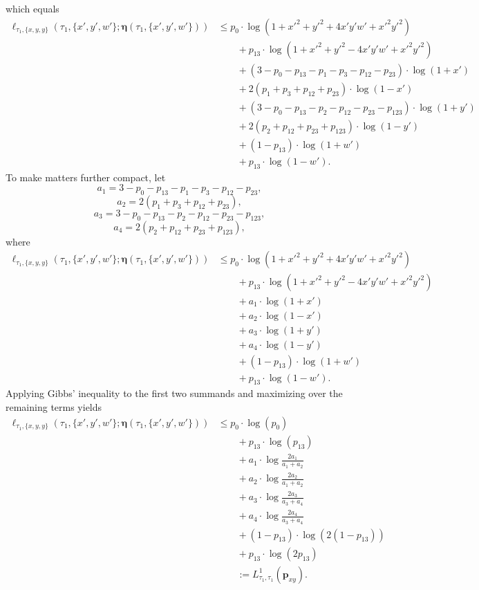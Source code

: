 \documentclass[a4paper]{article}
\newcommand{\fullAncestralSplitPartitions}{\boldsymbol\eta}
\begin{document}
which equals
\begin{align*}
    \ell_{\tau_1,\{x,y,y\}}(\tau_1, \{x',y',w'\}; \fullAncestralSplitPartitions(\tau_1,\{x',y',w'\}))
    &\le      p_{0}  \cdot\log(1+x'^2+y'^2+4x'y'w'+x'^2y'^2) \\
    &\qquad + p_{13} \cdot\log(1+x'^2+y'^2-4x'y'w'+x'^2y'^2) \\
    &\qquad + (3-p_{0}-p_{13}-p_{1}-p_{3}-p_{12}-p_{23})\cdot\log(1+x') \\
    &\qquad + 2(p_{1}+p_{3}+p_{12}+p_{23})\cdot\log(1-x') \\
    &\qquad + (3-p_{0}-p_{13}-p_{2}-p_{12}-p_{23}-p_{123})\cdot\log(1+y') \\
    &\qquad + 2(p_{2}+p_{12}+p_{23}+p_{123})\cdot\log(1-y') \\
    &\qquad + (1-p_{13})\cdot\log(1+w') \\
    &\qquad + p_{13}\cdot\log(1-w').
\end{align*}
To make matters further compact, let
$$
a_{1} = 3-p_{0}-p_{13}-p_{1}-p_{3}-p_{12}-p_{23},
$$
$$
a_{2} = 2(p_{1}+p_{3}+p_{12}+p_{23}),
$$
$$
a_{3} = 3-p_{0}-p_{13}-p_{2}-p_{12}-p_{23}-p_{123},
$$
$$
a_{4} = 2(p_{2}+p_{12}+p_{23}+p_{123}),
$$
where
\begin{align*}
    \ell_{\tau_1,\{x,y,y\}}(\tau_1, \{x',y',w'\}; \fullAncestralSplitPartitions(\tau_1,\{x',y',w'\}))
    &\le      p_{0}  \cdot\log(1+x'^2+y'^2+4x'y'w'+x'^2y'^2) \\
    &\qquad + p_{13} \cdot\log(1+x'^2+y'^2-4x'y'w'+x'^2y'^2) \\
    &\qquad + a_{1}\cdot\log(1+x') \\
    &\qquad + a_{2}\cdot\log(1-x') \\
    &\qquad + a_{3}\cdot\log(1+y') \\
    &\qquad + a_{4}\cdot\log(1-y') \\
    &\qquad + (1-p_{13})\cdot\log(1+w') \\
    &\qquad + p_{13}\cdot\log(1-w').
\end{align*}
Applying Gibbs' inequality to the first two summands and maximizing over the remaining terms yields
\begin{align*}
    \ell_{\tau_1,\{x,y,y\}}(\tau_1, \{x',y',w'\}; \fullAncestralSplitPartitions(\tau_1,\{x',y',w'\}))
    &\le      p_{0}  \cdot\log(p_{0}) \\
    &\qquad + p_{13} \cdot\log(p_{13}) \\
    &\qquad + a_{1}\cdot\log\frac{2a_{1}}{a_{1}+a_{2}} \\
    &\qquad + a_{2}\cdot\log\frac{2a_{2}}{a_{1}+a_{2}} \\
    &\qquad + a_{3}\cdot\log\frac{2a_{3}}{a_{3}+a_{4}} \\
    &\qquad + a_{4}\cdot\log\frac{2a_{4}}{a_{3}+a_{4}} \\
    &\qquad + (1-p_{13})\cdot\log(2(1-p_{13})) \\
    &\qquad + p_{13}\cdot\log(2p_{13}) \\
    &\qquad := L^{1}_{\tau_1,\tau_1}(\mathbf{p}_{xy}).
\end{align*}
\end{document}
